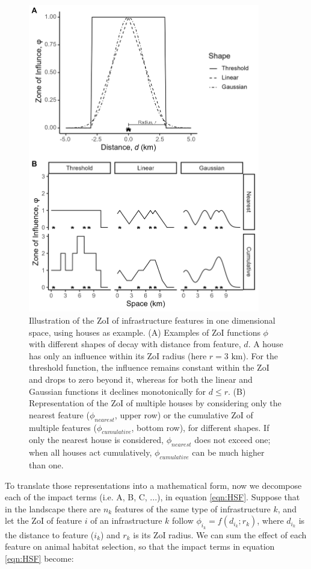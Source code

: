 \documentclass[titlepage]{article}
\begin{document}
\begin{figure}[!htbp]
\centering
\includegraphics[width=0.9\textwidth]{figures/ZoI_conceptual_new.png}
\caption{\label{fig:zoi_conceptual} Illustration of the ZoI of infrastructure features in one dimensional space, using houses as example. (A) Examples of ZoI functions $\phi$ with different shapes of decay with distance from feature, $d$. A house has only an influence within its ZoI radius (here $r = 3 \text{ km}$). For the threshold function, the influence remains constant within the ZoI and drops to zero beyond it, whereas for both the linear and Gaussian functions it declines monotonically for $d \leq r$. 
(B) Representation of the ZoI of multiple houses by considering only the nearest feature ($\phi_{nearest}$, upper row) or the cumulative ZoI of multiple features ($\phi_{cumulative}$, bottom row), for different shapes. If only the nearest house is considered, $\phi_{nearest}$ does not exceed one; when all houses act cumulatively, $\phi_{cumulative}$ can be much higher than one.}
\end{figure}

To translate those representations into a mathematical form, now we decompose each of the impact terms (i.e. A, B, C, ...), in equation \ref{eqn:HSF}. Suppose that in the landscape there are $n_k$ features of the same type of infrastructure $k$, and let the ZoI of feature $i$ of an infrastructure $k$ follow $\phi_{i_k} = f(d_{i_k}; r_k)$, where $d_{i_k}$ is the distance to feature ($i_k$) and $r_k$ is its ZoI radius. We can sum the effect of each feature on animal habitat selection, so that the impact terms in equation \ref{eqn:HSF} become:
\end{document}
